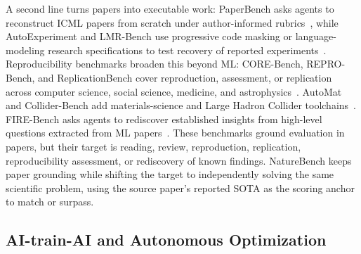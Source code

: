 A second line turns papers into executable work: PaperBench asks agents to reconstruct ICML papers from scratch under author-informed rubrics~\citep{starace2025paperbench}, while AutoExperiment and LMR-Bench use progressive code masking or language-modeling research specifications to test recovery of reported experiments~\citep{kim2025autoexperiment,yan2025lmrbench}. Reproducibility benchmarks broaden this beyond ML: CORE-Bench, REPRO-Bench, and ReplicationBench cover reproduction, assessment, or replication across computer science, social science, medicine, and astrophysics~\citep{siegel2024corebench,hu2025reprobench,ye2025replicationbench}. AutoMat and Collider-Bench add materials-science and Large Hadron Collider toolchains~\citep{huang2026automat,faroughy2026colliderbench}. FIRE-Bench asks agents to rediscover established insights from high-level questions extracted from ML papers~\citep{wang2026firebench}. These benchmarks ground evaluation in papers, but their target is reading, review, reproduction, replication, reproducibility assessment, or rediscovery of known findings. NatureBench keeps paper grounding while shifting the target to independently solving the same scientific problem, using the source paper's reported SOTA as the scoring anchor to match or surpass.





\subsection{AI-train-AI and Autonomous Optimization}
\label{sec:rel:mle}

